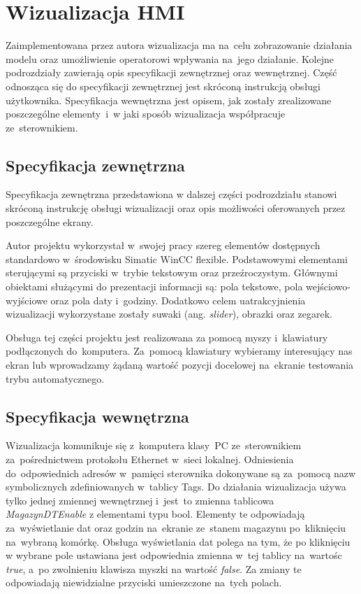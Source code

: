 \section{Wizualizacja HMI}
Zaimplementowana przez autora wizualizacja ma na~celu zobrazowanie działania modelu oraz umożliwienie operatorowi wpływania na~jego działanie. Kolejne podrozdziały zawierają opis specyfikacji zewnętrznej oraz wewnętrznej. Część odnosząca się do specyfikacji zewnętrznej jest skróconą instrukcją obsługi użytkownika. Specyfikacja wewnętrzna jest opisem, jak zostały zrealizowane poszczególne elementy~i~w jaki sposób wizualizacja współpracuje ze~sterownikiem.

\subsection{Specyfikacja zewnętrzna}
Specyfikacja zewnętrzna przedstawiona w dalszej części podrozdziału stanowi skróconą instrukcję obsługi wizualizacji oraz opis możliwości oferowanych przez poszczególne ekrany.

Autor projektu wykorzystał w~swojej pracy szereg elementów dostępnych standardowo w~środowisku Simatic WinCC flexible. Podstawowymi elementami sterującymi są przyciski w~trybie tekstowym oraz przeźroczystym. Głównymi obiektami służącymi do prezentacji informacji są: pola tekstowe, pola wejściowo-wyjściowe oraz pola daty i~godziny. Dodatkowo celem uatrakcyjnienia wizualizacji wykorzystane zostały suwaki (ang. \emph{slider}), obrazki oraz zegarek. 

Obsługa tej części projektu jest realizowana za pomocą myszy i~klawiatury podłączonych do~komputera. Za~pomocą klawiatury wybieramy interesujący nas ekran lub wprowadzamy żądaną wartość pozycji docelowej na~ekranie testowania trybu automatycznego.

\subsection{Specyfikacja wewnętrzna}
Wizualizacja komunikuje się z~komputera klasy~PC ze~sterownikiem za~pośrednictwem protokołu Ethernet w~sieci lokalnej.
Odniesienia do~odpowiednich adresów w~pamięci sterownika dokonywane są za~pomocą nazw symbolicznych zdefiniowanych w~tablicy Tags. Do działania wizualizacja używa tylko jednej zmiennej wewnętrznej i~jest~to zmienna tablicowa \emph{MagazynDTEnable} z elementami typu bool. Elementy te odpowiadają za~wyświetlanie dat oraz godzin na~ekranie ze~stanem magazynu po~kliknięciu na~wybraną komórkę. Obsługa wyświetlania dat polega na tym, że po kliknięciu w wybrane pole ustawiana jest odpowiednia zmienna w~tej tablicy na~wartośc \emph{true}, a~po zwolnieniu klawisza myszki na wartość \emph{false}. Za zmiany te odpowiadają niewidzialne przyciski umieszczone na~tych polach.

